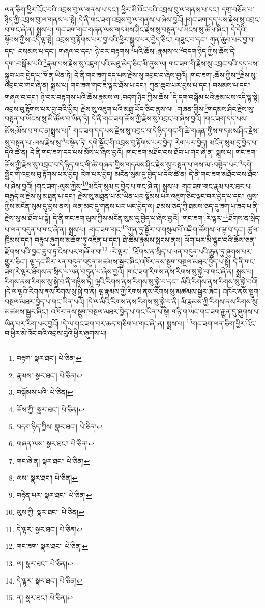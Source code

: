 ལན་ཅིག་ཕྱིར་འོང་བའི་འབྲས་བུ་ལ་གནས་པ་དང་། ཕྱིར་མི་འོང་བའི་འབྲས་བུ་ལ་གནས་པ་དང་། དགྲ་བཅོམ་པ་ཉིད་ཀྱི་འབྲས་བུ་ལ་གནས་པ་སྟེ། དེ་ནི་གང་ཟག་འབྲས་བུ་ལ་གནས་པ་ཞེས་བྱའོ། །གང་ཟག་དད་པས་རྗེས་སུ་འབྲང་བ་གང་ཞེ་ན། སྨྲས་པ། གང་ཟག་གང་གཞན་ལས་གདམས་ཤིང་རྗེས་སུ་བསྟན་པ་ཡོངས་སུ་ཚོལ་ཞིང་། དེ་དེའི་སྟོབས་ཀྱིས་འདི་ལྟ་སྟེ། འབྲས་བུ་རྟོགས་པར་བྱ་བའི་ཕྱིར་སྒྲུབ་པར་བྱེད་ཅིང་། གཟུང་བ་དང་། ཀུན་ཆུབ་པར་བྱ་བ་དང་། བསམས་པ་དང་། གཞལ་བ་དང་། ཉེ་བར་བརྟགས་\footnote{བརྟག་  སྣར་ཐང་།  པེ་ཅིན། }པའི་ཆོས་:རྣམས་ལ་\footnote{རྣམས་  སྣར་ཐང་།  པེ་ཅིན། }བདག་ཉིད་ཀྱིས་ཆོས་དེ་དག་:བསྒོམ་པའི་\footnote{བསྒོམས་པའི་  པེ་ཅིན། }རྣམ་པས་རྗེས་སུ་འཇུག་པའི་མཐུ་མེད་ཅིང་མི་ནུས་ལ། གང་ཟག་གི་རྗེས་སུ་འབྲང་བའི་དད་པས་སྒྲུབ་པར་བྱེད་པ་ཁོ་ན་ཡིན་ཏེ། དེ་ནི་གང་ཟག་དད་པས་རྗེས་སུ་འབྲང་བ་ཞེས་བྱའོ། །གང་ཟག་:ཆོས་ཀྱིས་\footnote{ཆོས་ཀྱི་  སྣར་ཐང་།  པེ་ཅིན། }རྗེས་སུ་འབྲང་བ་གང་ཞེ་ན། སྨྲས་པ། གང་ཟག་གང་ཇི་ལྟར་ཐོས་པ་དང་། ཀུན་ཆུབ་པར་བྱས་པ་དང་། བསམས་པ་དང་། གཞལ་བ་དང་། ཉེ་བར་བརྟགས་པའི་ཆོས་རྣམས་ལ་:བདག་ཉིད་ཀྱིས་ཆོས་\footnote{བདག་ཉིད་ཀྱིས་  སྣར་ཐང་།  པེ་ཅིན། }དེ་དག་བསྒོམ་པའི་རྣམ་པས་འདི་ལྟ་སྟེ། འབྲས་བུ་རྟོགས་པར་བྱ་བའི་ཕྱིར། རྗེས་སུ་འཇུག་པའི་མཐུ་ཡོད་ཅིང་ནུས་ལ། :གཞན་གྱིས་\footnote{གཞན་ལས་  སྣར་ཐང་།  པེ་ཅིན། }གདམས་ཤིང་རྗེས་སུ་བསྟན་པ་ཡོངས་སུ་མི་ཚོལ་བ་ཡིན་ཏེ། དེ་ནི་གང་ཟག་ཆོས་ཀྱི་རྗེས་སུ་འབྲང་བ་ཞེས་བྱའོ། །གང་ཟག་དད་པས་མོས:མོས་པ་གང་ན།སྨྲས་པ།\footnote{གང་ཞེ་ན།  སྣར་ཐང་།  པེ་ཅིན། } གང་ཟག་དད་པས་རྗེས་སུ་འབྲང་བ་དེ་ཉིད་གང་གི་ཚེ་གཞན་གྱིས་གདམས་ཤིང་རྗེས་སུ་བསྟན་པ་:ལས་རྗེས་སུ་\footnote{ལས་  སྣར་ཐང་།  པེ་ཅིན། }བསྟེན་ཏེ། དགེ་སྦྱོང་གི་འབྲས་བུ་རྟོགས་པར་བྱེད། རེག་པར་བྱེད། མངོན་སུམ་དུ་བྱེད་པ་དེའི་ཚེ་ན། དེ་ནི་གང་ཟག་དད་པས་མོས་པ་ཞེས་བྱའོ། །གང་ཟག་མཐོང་བས་ཐོབ་པ་གང་ཞེ་ན། སྨྲས་པ། གང་ཟག་ཆོས་ཀྱི་རྗེས་སུ་འབྲང་བ་དེ་ཉིད་གང་གི་ཚེ་གཞན་གྱིས་གདམས་ཤིང་རྗེས་སུ་བསྟན་པ་ལས་མ་:བསྟེན་པར་\footnote{བརྟེན་པར་  སྣར་ཐང་།  པེ་ཅིན། }དགེ་སྦྱོང་གི་འབྲས་བུ་རྟོགས་པར་བྱེད། རེག་པར་བྱེད། མངོན་སུམ་དུ་བྱེད་པ་དེའི་ཚེ་ན། དེ་ནི་གང་ཟག་མཐོང་བས་ཐོབ་པ་ཞེས་བྱའོ། །གང་ཟག་:ལུས་ཀྱིས་\footnote{ལུས་ཀྱི་  སྣར་ཐང་།  པེ་ཅིན། }མངོན་སུམ་དུ་བྱེད་པ་གང་ཞེ་ན། སྨྲས་པ། གང་ཟག་གང་རྣམ་པར་ཐར་པ་བརྒྱད་ལ་རྗེས་སུ་མཐུན་པ་དང་། རྗེས་སུ་མཐུན་པ་མ་ཡིན་པར་སྙོམས་པར་འཇུག་ཅིང་ལྡང་བར་བྱེད་པ་དང་། ལུས་ཀྱིས་མངོན་སུམ་དུ་བྱས་ནས། ལན་མང་དུ་གནས་པར་ཡང་བྱེད་ལ། ཐམས་ཅད་ཀྱི་ཐམས་ཅད་དུ་ཟག་པ་ཟད་པ་ནི་རྗེས་སུ་མ་ཐོབ་པ་སྟེ། དེ་ནི་གང་ཟག་ལུས་ཀྱིས་མངོན་སུམ་དུ་བྱེད་པ་ཞེས་བྱའོ། །གང་ཟག་:རེ་ལྟར་\footnote{དེ་ལྟར་  སྣར་ཐང་།  པེ་ཅིན། }ཐོགས་ན་སྲིད་པ་ལན་བདུན་པ་གང་ཞེ་ན། སྨྲས་པ། :གང་ཟག་གང་\footnote{གང་ཟག་  སྣར་ཐང་།  པེ་ཅིན། }ཀུན་ཏུ་སྦྱོར་བ་གསུམ་པོ་འཇིག་ཚོགས་ལ་ལྟ་བ་དང་། ཚུལ་ཁྲིམས་དང་། བརྟུལ་ཞུགས་མཆོག་ཏུ་འཛིན་པ་དང་། ཐེ་ཚོམ་རྣམས་སྤངས་ནས། ལོག་པར་མི་ལྟུང་བའི་ཆོས་ཅན་རྫོགས་པའི་བྱང་ཆུབ་ཏུ་ངེས་པར་གཞོལ་བ།\footnote{ལ།  སྣར་ཐང་།  པེ་ཅིན། } :རེ་ལྟར་\footnote{དེ་ལྟར་  སྣར་ཐང་།  པེ་ཅིན། }ཐོགས་ན་སྲིད་པ་ལན་བདུན་པའི་རྒྱུན་ཏུ་ཞུགས་པར་གྱུར་ཅིང་། ལྷ་དང་མིར་ལན་བདུན་བདུན་མཚམས་སྦྱར་ཞིང་འཁོར་ནས་སྡུག་བསྔལ་མཐར་བྱེད་པ་སྟེ། དེ་ནི་གང་ཟག་རེ་ལྟར་ཐོགས་ན་སྲིད་པ་ལན་བདུན་པ་ཞེས་བྱའོ། །གང་ཟག་རིགས་ནས་རིགས་སུ་སྐྱེ་བ་གང་ཞེ་ན། སྨྲས་པ། རིགས་ནས་རིགས་སུ་སྐྱེ་བ་ནི་གཉིས་ཏེ། ལྷའི་རིགས་ནས་རིགས་སུ་སྐྱེ་བ་དང་། མིའི་རིགས་ནས་རིགས་སུ་སྐྱེ་བའོ། །དེ་ལ་ལྷའི་རིགས་ནས་རིགས་སུ་སྐྱེ་བ་ནི། ལྷ་རྣམས་ཀྱི་རིགས་ནས་རིགས་སུ་མཚམས་སྦྱར་ཞིང་། འཁོར་ནས་སྡུག་བསྔལ་མཐར་བྱེད་པ་གང་ཡིན་པའོ། །དེ་ལ་མིའི་རིགས་ནས་རིགས་སུ་སྐྱེ་བ་ནི། མི་རྣམས་ཀྱི་རིགས་ནས་རིགས་སུ་མཚམས་སྦྱར་ཞིང་། འཁོར་ནས་སྡུག་བསྔལ་མཐར་བྱེད་པ་གང་ཡིན་པ་སྟེ། གཉི་ག་ཡང་གང་ཟག་རྒྱུན་དུ་ཞུགས་པ་ཡིན་པར་རིག་པར་བྱའོ། །དེ་ལ་གང་ཟག་བར་ཆད་གཅིག་པ་གང་ཞེ་:ན། སྨྲས་པ། \footnote{ན།    སྣར་ཐང་།  པེ་ཅིན། }གང་ཟག་ལན་ཅིག་ཕྱིར་འོང་བ་ཕྱིར་མི་འོང་བའི་འབྲས་བུའི་ཕྱིར་ཞུགས་པ། 